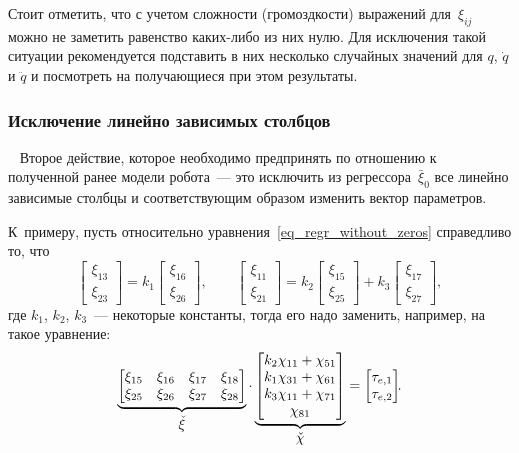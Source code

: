 Стоит отметить, что с учетом сложности (громоздкости) выражений для~$\xi_{ij}$ можно не заметить равенство каких-либо из них нулю.
Для исключения такой ситуации рекомендуется подставить в них несколько случайных значений для $q$, $\dot{q}$ и $\ddot{q}$ и посмотреть на получающиеся при этом результаты.


\subsubsection{Исключение линейно зависимых столбцов}~\label{part_lin_depend_columns_deleting}
Второе действие, которое необходимо предпринять по отношению к полученной ранее модели робота~--- это исключить из регрессора~$\bar{\xi}_0$ все линейно зависимые столбцы и соответствующим образом изменить вектор параметров.

К~примеру, пусть относительно уравнения~\eqref{eq_regr_without_zeros} справедливо то, что
\begin{equation}
    \begin{bmatrix}
        \xi_{13} \\ \xi_{23}
    \end{bmatrix}
    =
    k_1
    \begin{bmatrix}
        \xi_{16} \\ \xi_{26}
    \end{bmatrix}\!\!,
    \qquad
    \begin{bmatrix}
        \xi_{11} \\ \xi_{21}
    \end{bmatrix}
    =
    k_2
    \begin{bmatrix}
        \xi_{15} \\ \xi_{25}
    \end{bmatrix}
    +
    k_3
    \begin{bmatrix}
        \xi_{17} \\ \xi_{27}
    \end{bmatrix}\!\!,
\end{equation}
где $k_1$, $k_2$, $k_3$~--- некоторые константы, тогда его надо заменить, например, на такое уравнение:
\begin{equation}
    \underbrace{
        \begin{bmatrix}
            \xi_{15} & \xi_{16} & \xi_{17} & \xi_{18} \\
            \xi_{25} & \xi_{26} & \xi_{27} & \xi_{28}
        \end{bmatrix}
    }_{\displaystyle \check\xi}
    \cdot
    \underbrace{
        \begin{bmatrix}
            k_2\chi_{11} + \chi_{51} \\ k_1\chi_{31} + \chi_{61} \\ k_3\chi_{11} + \chi_{71} \\ \chi_{81}
        \end{bmatrix}
    }_{\displaystyle \check\chi}
    =
    \begin{bmatrix}
        \tau_{e,1} \\ \tau_{e,2}
    \end{bmatrix}\!\!\ldotp
\end{equation}

